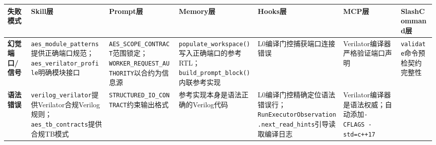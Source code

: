 {\def\LTcaptype{none} %
\begin{longtable}[]{@{}
  >{\raggedright\arraybackslash}p{}
  >{\raggedright\arraybackslash}p{}
  >{\raggedright\arraybackslash}p{}
  >{\raggedright\arraybackslash}p{}
  >{\raggedright\arraybackslash}p{}
  >{\raggedright\arraybackslash}p{}
  >{\raggedright\arraybackslash}p{}@{}}
\toprule\noalign{}
\begin{minipage}[b]{\linewidth}\raggedright
失败模式
\end{minipage} & \begin{minipage}[b]{\linewidth}\raggedright
Skill层
\end{minipage} & \begin{minipage}[b]{\linewidth}\raggedright
Prompt层
\end{minipage} & \begin{minipage}[b]{\linewidth}\raggedright
Memory层
\end{minipage} & \begin{minipage}[b]{\linewidth}\raggedright
Hooks层
\end{minipage} & \begin{minipage}[b]{\linewidth}\raggedright
MCP层
\end{minipage} & \begin{minipage}[b]{\linewidth}\raggedright
SlashCommand层
\end{minipage} \\
\midrule\noalign{}
\endhead
\bottomrule\noalign{}
\endlastfoot
\textbf{幻觉端口/信号} &
\texttt{aes\_module\_patterns}提供正确端口规范；\texttt{aes\_verilator\_profile}明确模块接口
&
\texttt{AES\_SCOPE\_CONTRACT}范围锁定；\texttt{WORKER\_REQUEST\_AUTHORITY}以合约为信息源
&
\texttt{populate\_workspace()}写入正确端口的参考RTL；\texttt{build\_prompt\_block()}内联参考实现
& L0编译门控捕获端口连接错误 & Verilator编译器严格验证端口声明 &
\texttt{validate}命令预检契约完整性 \\
\textbf{语法错误} &
\texttt{verilog\_verilator}提供Verilator合规Verilog规则；\texttt{aes\_tb\_contracts}提供合规TB模式
& \texttt{STRUCTURED\_IO\_CONTRACT}约束输出格式 &
参考实现本身是语法正确的Verilog代码 &
L0编译门控精确定位语法错误行；\texttt{RunExecutorObservation.next\_read\_hints}引导读取编译日志
& Verilator编译器是语法权威；自动添加\texttt{-CFLAGS\ -std=c++17} &

\end{longtable}}
